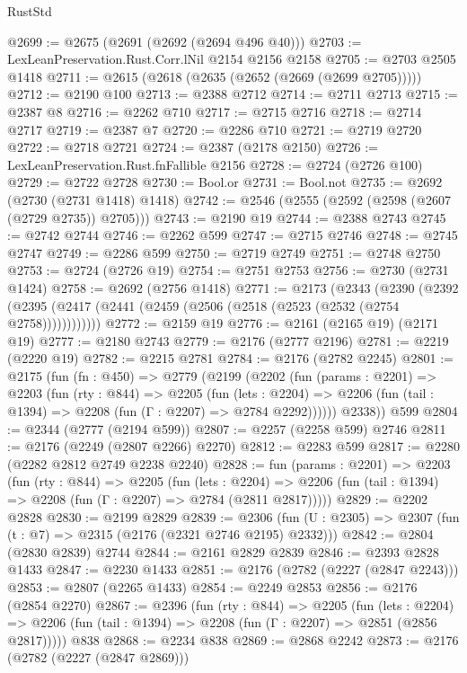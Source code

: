 \begin{lexlean}{RustStd}
\begin{coremodule}
{\begin{coremodule}
{{{{{{{{{{@2699 := @2675 (@2691 (@2692 (@2694 @496 @40)))
@2703 := LexLeanPreservation.Rust.Corr.lNil @2154 @2156 @2158
@2705 := @2703 @2505 @1418
@2711 := @2615 (@2618 (@2635 (@2652 (@2669 (@2699 @2705)))))
@2712 := @2190 @100
@2713 := @2388 @2712
@2714 := @2711 @2713
@2715 := @2387 @8
@2716 := @2262 @710
@2717 := @2715 @2716
@2718 := @2714 @2717
@2719 := @2387 @7
@2720 := @2286 @710
@2721 := @2719 @2720
@2722 := @2718 @2721
@2724 := @2387 (@2178 @2150)
@2726 := LexLeanPreservation.Rust.fnFallible @2156
@2728 := @2724 (@2726 @100)
@2729 := @2722 @2728
@2730 := Bool.or
@2731 := Bool.not
@2735 := @2692 (@2730 (@2731 @1418) @1418)
@2742 := @2546 (@2555 (@2592 (@2598 (@2607 (@2729 @2735)) @2705)))
@2743 := @2190 @19
@2744 := @2388 @2743
@2745 := @2742 @2744
@2746 := @2262 @599
@2747 := @2715 @2746
@2748 := @2745 @2747
@2749 := @2286 @599
@2750 := @2719 @2749
@2751 := @2748 @2750
@2753 := @2724 (@2726 @19)
@2754 := @2751 @2753
@2756 := @2730 (@2731 @1424)
@2758 := @2692 (@2756 @1418)
@2771 := @2173
    (@2343
      (@2390 (@2392 (@2395 (@2417 (@2441 (@2459 (@2506 (@2518 (@2523 (@2532 (@2754 @2758))))))))))))
@2772 := @2159 @19
@2776 := @2161 (@2165 @19) (@2171 @19)
@2777 := @2180 @2743
@2779 := @2176 (@2777 @2196)
@2781 := @2219 (@2220 @19)
@2782 := @2215 @2781
@2784 := @2176 (@2782 @2245)
@2801 := @2175
    (fun (fn : @450) =>
    @2779
      (@2199
        (@2202
          (fun (params : @2201) =>
          @2203
            (fun (rty : @844) =>
            @2205
              (fun (lets : @2204) =>
              @2206 (fun (tail : @1394) => @2208 (fun (Γ : @2207) => @2784 @2292))))))
        @2338))
    @599
@2804 := @2344 (@2777 (@2194 @599))
@2807 := @2257 (@2258 @599) @2746
@2811 := @2176 (@2249 (@2807 @2266) @2270)
@2812 := @2283 @599
@2817 := @2280 (@2282 @2812 @2749 @2238 @2240)
@2828 := fun (params : @2201) =>
  @2203
    (fun (rty : @844) =>
    @2205
      (fun (lets : @2204) =>
      @2206 (fun (tail : @1394) => @2208 (fun (Γ : @2207) => @2784 (@2811 @2817)))))
@2829 := @2202 @2828
@2830 := @2199 @2829
@2839 := @2306 (fun (U : @2305) => @2307 (fun (t : @7) => @2315 (@2176 (@2321 @2746 @2195) @2332)))
@2842 := @2804 (@2830 @2839) @2744
@2844 := @2161 @2829 @2839
@2846 := @2393 @2828 @1433
@2847 := @2230 @1433
@2851 := @2176 (@2782 (@2227 (@2847 @2243)))
@2853 := @2807 (@2265 @1433)
@2854 := @2249 @2853
@2856 := @2176 (@2854 @2270)
@2867 := @2396
    (fun (rty : @844) =>
    @2205
      (fun (lets : @2204) =>
      @2206 (fun (tail : @1394) => @2208 (fun (Γ : @2207) => @2851 (@2856 @2817)))))
    @838
@2868 := @2234 @838
@2869 := @2868 @2242
@2873 := @2176 (@2782 (@2227 (@2847 @2869)))
}}}}}}}}}}
\end{coremodule}}
\end{coremodule}
\end{lexlean}
